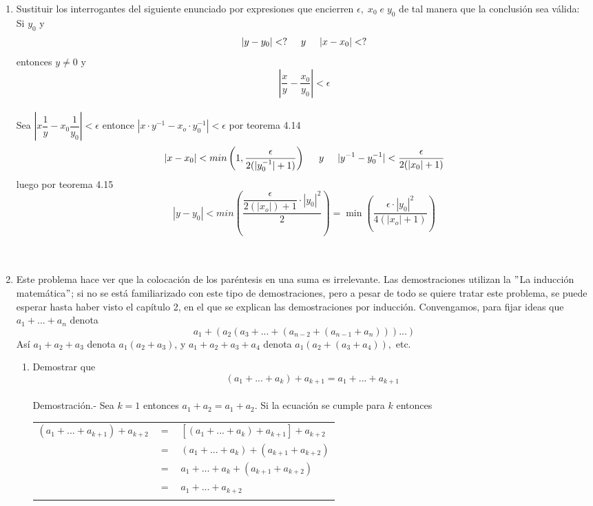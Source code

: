 \begin{enumerate}[\bfseries 1.]
\item Sustituir los interrogantes del siguiente enunciado por expresiones que encierren $\epsilon, \; x_0 \; e \; y_0$ de tal manera que la conclusión sea válida:\\
Si $y_0$ y $$|y - y_0|< ? \hspace{0.5cm} y \hspace{0.5cm} |x - x_0|< ?$$ entonces $y \neq 0$ y $$\left| \dfrac{x}{y} - \dfrac{x_0}{y_0} \right|< \epsilon$$ \\
Sea $|x \dfrac{1}{y} - x_0 \dfrac{1}{y_0}|< \epsilon$ entonce $|x \cdot y^{-1} - x_o \cdot y_0^{-1}| < \epsilon$ por teorema 4.14 $$|x- x_0| < min \left( 1, \dfrac{\epsilon}{2(|y_0^{-1}|+1)} \right) \hspace{0.5cm} y \hspace{0.5cm} |y^{-1} - y_0^{-1}| < \dfrac{\epsilon}{2(|x_0|+1)}  $$ luego por teorema 4.15 $$|y - y_0| < min \left( \dfrac{\dfrac{\epsilon}{2 (|x_o|)+1} \cdot |y_0|^2}{2} \right) = \min \left( \dfrac{\epsilon \cdot |y_0|^2}{4(|x_o|+1)} \right)$$ \\\\

\item Este problema hace ver que la colocación de los paréntesis en una suma es irrelevante. Las demostraciones utilizan la $"$La inducción matemática$"$; si no se está familiarizado con este tipo de demostraciones, pero a pesar de todo se quiere tratar este problema, se puede esperar hasta haber visto el capítulo 2, en el que se explican las demostraciones por inducción. Convengamos, para fijar ideas que $a_1 + ... + a_n$ denota $$a_1 + (a_2(a_3+...+(a_{n-2}+(a_{n-1}+ a_n)))...)$$
Así $a_1+a_2+a_3$ denota $a_1(a_2+a_3)$, y $a_1+a_2+a_3+a_4$ denota $a_1(a_2+(a_3+a_4)),$ etc.
\begin{enumerate}[\bfseries (a)]
\item Demostrar que $$(a_1+...+a_k)+a_{k+1}=a_1+...+a_{k+1}$$\\
Demostración.- \; Sea $k=1$ entonces $a_1+a_2=a_1+a_2$. Si la ecuación se cumple para $k$ entonces 
\begin{center}
\begin{tabular}{r c l}
$(a_1+...+a_{k+1})+a_{k+2}$&$=$&$[(a_1+...+a_k)+a_{k+1}]+a_{k+2}$\\
&$=$&$(a_1+...+a_k)+(a_{k+1}+a_{k+2})$\\
&$=$&$a_1+...+a_k + (a_{k+1}+a_{k+2})$\\
&$=$&$a_1+...+a_{k+2}$\\\\
\end{tabular}
\end{center}


\end{enumerate}
\end{enumerate}

